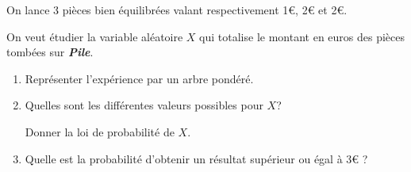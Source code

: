 
%
On lance 3 pièces bien équilibrées valant respectivement 1€, 2€ et 2€.
\par
On veut étudier la variable aléatoire $X$ qui totalise le montant en euros des pièces tombées sur \textbf{\textit{Pile}}.
\begin{enumerate}
     \item
     Représenter l'expérience par un arbre pondéré.
     \item
     Quelles sont les différentes valeurs possibles pour $X$?
     \par
     Donner la loi de probabilité de $X$.
     \item
     Quelle est la probabilité d'obtenir un résultat supérieur ou égal à 3€ ?
\end{enumerate}
